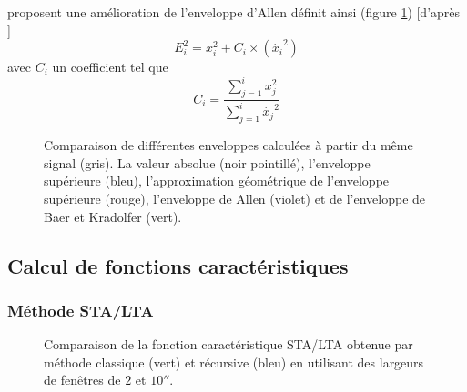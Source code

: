 \documentclass[a4paper, 11pt]{article} %
\begin{document}
\cite{baer1987} proposent une amélioration de l'enveloppe d'Allen définit ainsi (figure \ref{fig:env-comp}) [d'après \cite{kuperkoch2010}]
\begin{equation}
   E_i^2 = x_i^2 + C_i \times (\dot{x_i}^2)
\end{equation}
avec $C_i$ un coefficient tel que
\begin{equation}
   C_i = \frac{\sum_{j=1}^{i}{x_j^2}}{\sum_{j=1}^{i}{\dot{x_j}^2}}
\end{equation}

\begin{figure}[ht]
    \centering
    \scalebox{1}{}
    \caption{Comparaison de différentes enveloppes calculées à partir du même signal (gris). La valeur absolue (noir pointillé), l'enveloppe supérieure (bleu), l'approximation géométrique de l'enveloppe supérieure (rouge), l'enveloppe de Allen (violet) et de l'enveloppe de Baer et Kradolfer (vert).}
    \label{fig:env-comp}
\end{figure}

\subsection{Calcul de fonctions caractéristiques}

\subsubsection{Méthode STA/LTA}

\begin{figure}[!ht]
    \centering
    \scalebox{.9}{}
    \caption{Comparaison de la fonction caractéristique STA/LTA obtenue par méthode classique (vert) et récursive (bleu) en utilisant des largeurs de fenêtres de $2$ et $10 \second$.}
    \label{fig:stalta}
\end{figure}
\end{document}
